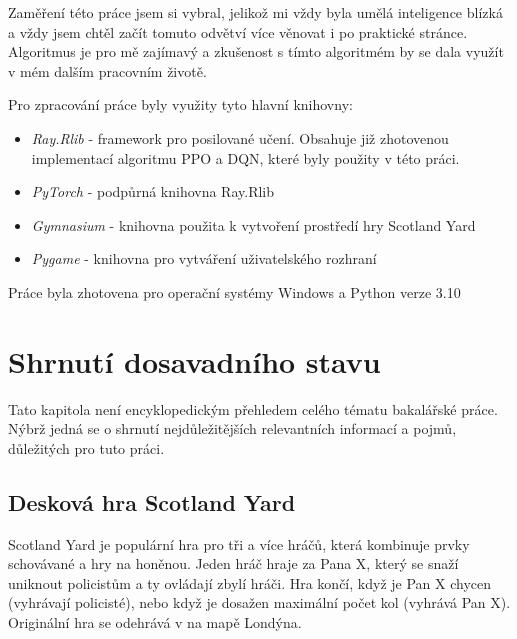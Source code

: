 Zaměření této práce jsem si vybral, jelikož mi vždy byla umělá inteligence blízká a vždy jsem chtěl začít tomuto odvětví více věnovat i po praktické stránce.
Algoritmus je pro mě zajímavý a zkušenost s tímto algoritmém by se dala využít v mém dalším pracovním životě.\newpage

Pro zpracování práce byly využity tyto hlavní knihovny:
\begin{itemize}
  \item \emph{Ray.Rlib} - framework pro posilované učení. Obsahuje již zhotovenou implementací algoritmu PPO a DQN, které byly použity v této práci. 
  \item \emph{PyTorch} - podpůrná knihovna Ray.Rlib
  \item \emph{Gymnasium} - knihovna použita k vytvoření prostředí hry Scotland Yard
  \item \emph{Pygame} - knihovna pro vytváření uživatelského rozhraní
\end{itemize}

Práce byla zhotovena pro operační systémy Windows a Python verze 3.10

\chapter{Shrnutí dosavadního stavu}
\label{ch:dosavadni_stav}
Tato kapitola není encyklopedickým přehledem celého tématu bakalářské práce.
Nýbrž jedná se o shrnutí nejdůležitějších relevantních informací a pojmů, důležitých pro tuto práci.

\section{Desková hra Scotland Yard}
\label{sec:deskova-hra-scotland-yard}

Scotland Yard je populární hra pro tři a více hráčů, která kombinuje prvky schovávané a hry na honěnou.
Jeden hráč hraje za Pana X, který se snaží uniknout policistům a ty ovládají zbylí hráči.
Hra končí, když je Pan X chycen (vyhrávají policisté), nebo když je dosažen maximální počet kol (vyhrává Pan X).
Originální hra se odehrává v na mapě Londýna.

